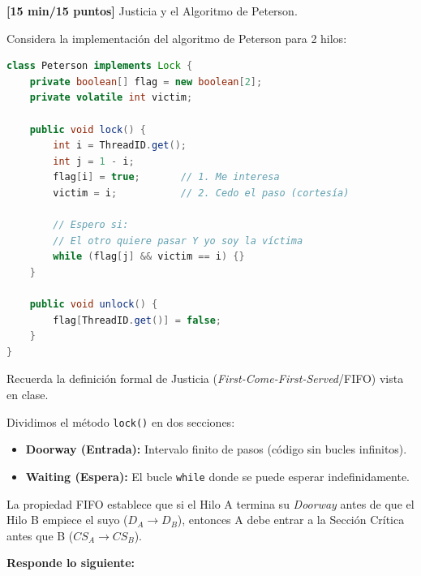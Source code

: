 \item[\textbf{4.}] \textbf{[15 min/15 puntos]} \textcolor{dkgreen}{Justicia y el Algoritmo de Peterson.}

    \textcolor{dkgreen}{Considera la implementación del algoritmo de Peterson para 2 hilos:}

    \begin{lstlisting}[language=Java]
class Peterson implements Lock {
    private boolean[] flag = new boolean[2];
    private volatile int victim;

    public void lock() {
        int i = ThreadID.get();
        int j = 1 - i;
        flag[i] = true;       // 1. Me interesa
        victim = i;           // 2. Cedo el paso (cortesía)

        // Espero si:
        // El otro quiere pasar Y yo soy la víctima
        while (flag[j] && victim == i) {}
    }

    public void unlock() {
        flag[ThreadID.get()] = false;
    }
}
    \end{lstlisting}

    \textcolor{dkgreen}{Recuerda la definición formal de Justicia (\textit{First-Come-First-Served}/FIFO) vista en clase.}

    \textcolor{dkgreen}{Dividimos el método \texttt{lock()} en dos secciones:}

    \begin{itemize}
        \item \textcolor{azul}{\textbf{Doorway (Entrada):} Intervalo finito de pasos (código sin bucles infinitos).}
        \item \textcolor{azul}{\textbf{Waiting (Espera):} El bucle \texttt{while} donde se puede esperar indefinidamente.}
    \end{itemize}

    \textcolor{dkgreen}{La propiedad FIFO establece que si el Hilo A termina su \textit{Doorway} antes de que el Hilo B empiece el suyo ($D_A \rightarrow D_B$), entonces A debe entrar a la Sección Crítica antes que B ($CS_A \rightarrow CS_B$).}

    \textcolor{azul}{\textbf{Responde lo siguiente:}}

